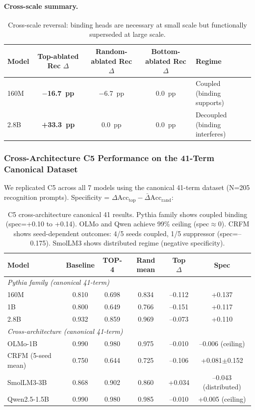 \documentclass[10pt]{article} %
\begin{document}
\paragraph{Cross-scale summary.}\mbox{}

\begin{table}[h]
\centering
\begin{tabular}{|l|c|c|c|p{1.8cm}|}
\hline
\textbf{Model} & \textbf{Top-ablated Rec $\Delta$} & \textbf{Random-ablated Rec $\Delta$} & \textbf{Bottom-ablated Rec $\Delta$} & \textbf{Regime} \\
\hline
160M & \textbf{$-$16.7~pp} & $-$6.7~pp & 0.0~pp & Coupled (binding supports) \\
2.8B & \textbf{+33.3~pp} & 0.0~pp & 0.0~pp & Decoupled (binding interferes) \\
\hline
\end{tabular}
\caption{Cross-scale reversal: binding heads are necessary at small scale but functionally superseded at large scale.}
\label{tab:c5_cross_scale}
\end{table}

\subsubsection{Cross-Architecture C5 Performance on the 41-Term Canonical Dataset}

We replicated C5 across all 7 models using the canonical 41-term dataset (N=205 recognition prompts).
Specificity = $\Delta\text{Acc}_\text{top} - \bar{\Delta}\text{Acc}_\text{rand}$:

\begin{table}[h]
\centering
\small
\begin{tabular}{|l|c|c|c|c|c|}
\hline
\textbf{Model} & \textbf{Baseline} & \textbf{TOP-4} & \textbf{Rand mean} & \textbf{Top $\Delta$} & \textbf{Spec} \\
\hline
\multicolumn{6}{|l|}{\textit{Pythia family (canonical 41-term)}} \\
160M & 0.810 & 0.698 & 0.834 & --0.112 & +0.137 \\
1B & 0.800 & 0.649 & 0.766 & --0.151 & +0.117 \\
2.8B & 0.932 & 0.859 & 0.969 & --0.073 & +0.110 \\
\hline
\multicolumn{6}{|l|}{\textit{Cross-architecture (canonical 41-term)}} \\
OLMo-1B & 0.990 & 0.980 & 0.975 & --0.010 & --0.006 (ceiling) \\
CRFM (5-seed mean) & 0.750 & 0.644 & 0.725 & --0.106 & +0.081$\pm$0.152 \\
SmolLM3-3B & 0.868 & 0.902 & 0.860 & +0.034 & --0.043 (distributed) \\
Qwen2.5-1.5B & 0.990 & 0.980 & 0.985 & --0.010 & +0.005 (ceiling) \\
\hline
\end{tabular}
\caption{C5 cross-architecture canonical 41 results. Pythia family shows coupled binding (spec=+0.10 to +0.14). OLMo and Qwen achieve 99\% ceiling (spec$\approx$0). CRFM shows seed-dependent outcomes: 4/5 seeds coupled, 1/5 suppressor (spec=--0.175). SmolLM3 shows distributed regime (negative specificity).}
\label{tab:c5_crossarch_main}
\end{table}
\end{document}
